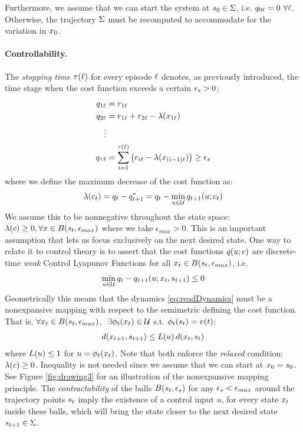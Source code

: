 Furthermore, we assume that we can start the system at $s_0 \in \Sigma$, i.e. $q_{0\ell} = 0 \ \forall \ell$. Otherwise, the trajectory $\Sigma$ must be recomputed to accommodate for the variation in $x_0$.

\paragraph{Controllability.} The \emph{stopping time} $\tau(\ell)$ for every episode $\ell$ denotes, as previously introduced, the time stage when the cost function exceeds a certain $\epsilon_s > 0$:
\begin{align}
q_{1\ell} &= r_{1\ell} \nonumber \\
q_{2\ell} &= r_{1\ell} + r_{2\ell} - \lambda(x_{1\ell}) \nonumber \\
\vdots \nonumber \\
q_{\tau \ell} &= \sum_{i=1}^{\tau(\ell)} \big(r_{i\ell} - \lambda(x_{(i-1)\ell})\big) \geq \epsilon_s \label{stopping-time}
\end{align}
where we define the maximum decrease of the cost function as:
\begin{align}
\lambda(c_t) = q_{t} - q_{t+1}^{*} = q_{t} - \min\limits_{u \in \mathcal{U}} q_{t+1}(u; c_t) \label{defn-lambda}
\end{align}
We assume this to be nonnegative throughout the state space: $\lambda(c) \geq 0, \forall x \in B(s_t, \epsilon_{max})$ where we take $\epsilon_{max} > 0$. This is an important assumption that lets us focus exclusively on the next desired state. One way to relate it to control theory is to assert that the cost functions $q(u; c)$ are discrete-time \emph{weak} Control Lyapunov Functions for all $x_t \in B(s_t,\epsilon_{max})$, i.e.
\begin{align}
\min\limits_{u \in \mathcal{U}} q_{t} - q_{t+1}(u; x_t, s_{t+1}) \leq 0
\end{align}
Geometrically this means that the dynamics \eqref{eq:readDynamics} must be a nonexpansive mapping with respect to the semimetric defining the cost function. That is, $\forall x_t \in B(s_t,\epsilon_{max})$, $\ \exists \phi_t(x_t) \in \mathcal{U}$ s.t. $\phi_t(s_t) = v(t)$:
\begin{align}
d(x_{t+1}, s_{t+1}) \leq L(u) \, d(x_{t}, s_{t}) 
\end{align}
where $L(u) \leq 1$ for $u = \phi_t(x_t)$. Note that both enforce the \emph{relaxed} condition: $\lambda(c) \geq 0$. Inequality is not needed since we assume that we can start at $x_0 = s_0$. See Figure \ref{fig:drawing3} for an illustration of the nonexpansive mapping principle. The \emph{contractability} of the balls $B(s_t,\epsilon_s)$ for any $\epsilon_s < \epsilon_{max}$ around the trajectory points $s_t$ imply the existence of a control input $u$, for every state $x_t$ inside these balls, which will bring the state closer to the next desired state $s_{t+1} \in \Sigma$.

